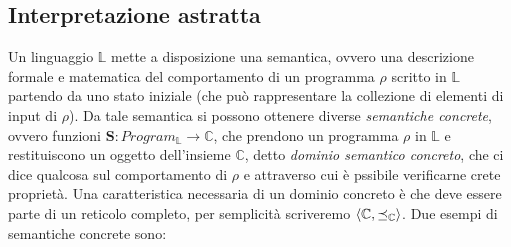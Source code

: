 \subsection{Interpretazione astratta}
Un linguaggio \(\mathbb{L}\) mette a disposizione una semantica, ovvero una descrizione formale e matematica del comportamento di un programma \(\rho\) scritto in \(\mathbb{L}\) partendo da uno stato iniziale (che può rappresentare la collezione di elementi di input di \(\rho\)). Da tale semantica si possono ottenere diverse \textit{semantiche concrete}, ovvero funzioni \(\textbf{S}:Program_\mathbb{L}\rightarrow \mathbb{C}\),  che prendono un programma \(\rho\) in \(\mathbb{L}\) e restituiscono un oggetto dell'insieme \(\mathbb{C}\), detto \textit{dominio semantico concreto}, che ci dice qualcosa sul comportamento di \(\rho\) e attraverso cui è pssibile verificarne crete proprietà. Una caratteristica necessaria di un dominio concreto è che deve essere parte di un reticolo completo, per semplicità scriveremo \(\langle \mathbb{C}, \preceq_{\mathbb{C}}\rangle\). Due esempi di semantiche concrete sono:
